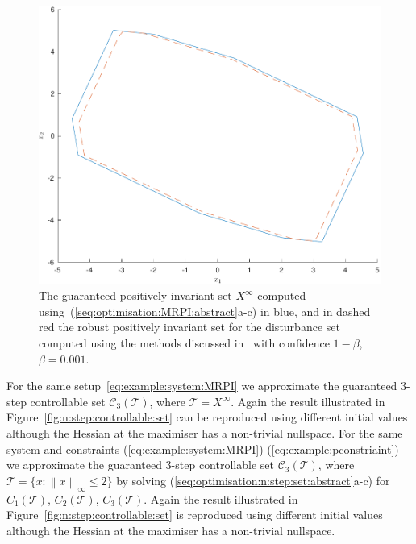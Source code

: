 \documentclass{ifacconf}
\providecommand{\norm}[1]{\left\|#1\right\|}
\providecommand{\C}{\mathscr C}
\providecommand{\T}{\mathcal T}
\begin{document}
\begin{figure}
\includegraphics[width=.95\linewidth]{MRPIsetOptimised.pdf}
\caption{The guaranteed positively invariant set $X^\infty$ computed using~(\ref{seq:optimisation:MRPI:abstract}a-c) 
in \textcolor[rgb]{0,0.5216,0.7373}{blue}, and in \textcolor[rgb]{1,0,0}{dashed red} the robust positively invariant set for the disturbance set computed using the methods discussed in~\cite{Zhang2015} with 
confidence $1-\beta$, $\beta = 0.001$.}
\label{fig:MRPI:optimised}
\vspace{4mm}\end{figure}


For the same setup~\eqref{eq:example:system:MRPI} we approximate the guaranteed 3-step controllable set $\C_3(\T)$, where $\T=X^\infty$.
%
Again the result illustrated in Figure~\ref{fig:n:step:controllable:set} can be reproduced using different initial values although the Hessian at the maximiser has a non-trivial nullspace.
%
For the same system and constraints (\ref{eq:example:system:MRPI})-(\ref{eq:example:pconstriaint}) we approximate the guaranteed 3-step controllable set $\C_3(\T)$, where $\T=\{x:\norm{x}_\infty\leq 2\}$
%
by solving (\ref{seq:optimisation:n:step:set:abstract}a-c) for $C_1(\T)$, $C_2(\T)$, $C_3(\T)$.
%
Again the result illustrated in Figure~\ref{fig:n:step:controllable:set} is reproduced using different initial values although the Hessian at the maximiser has a non-trivial nullspace.
%
\end{document}
